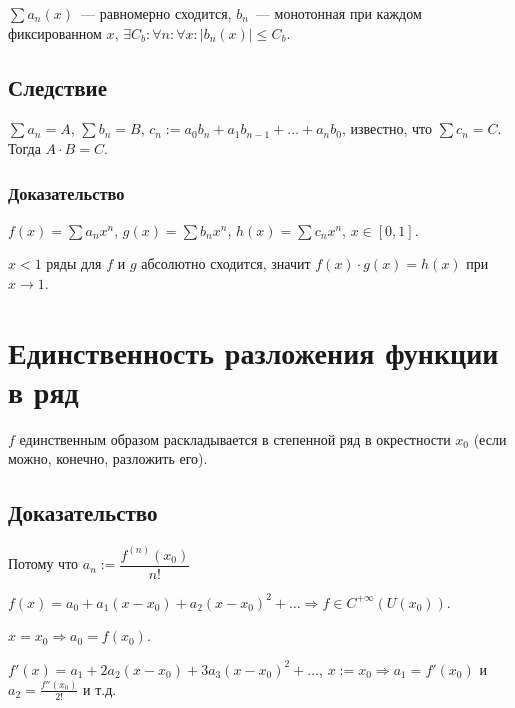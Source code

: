 \documentclass{article}
\begin{document}
            $\sum a_n(x)$~--- равномерно сходится, $b_n$~--- монотонная при каждом фиксированном $x$, $\exists C_b : \forall n : \forall x : | b_n(x) | \leq C_b$.
            
        \subsection{Следствие}
        
            $\sum a_n = A$, $\sum b_n = B$, $c_n := a_0 b_n + a_1 b_{n - 1} + \ldots + a_n b_0$, известно, что $\sum c_n = C$. Тогда $A \cdot B = C$.
            
            \subsubsection{Доказательство}
            
                $f(x) = \sum a_n x^n$, $g(x) = \sum b_n x^n$, $h(x) = \sum c_n x^n$, $x \in [0, 1]$.
                
                $x < 1$ ряды для $f$ и $g$ абсолютно сходится, значит $f(x) \cdot g(x) = h(x)$ при $x \rightarrow 1$.
                
    \newpage
    
    \section{Единственность разложения функции в ряд}
    
        $f$ единственным образом раскладывается в степенной ряд в окрестности $x_0$ (если можно, конечно, разложить его).
        
        \subsection{Доказательство}
        
            Потому что $a_n := \dfrac{f^{(n)}(x_0)}{n!}$
            
            $f(x) = a_0 + a_1(x - x_0) + a_2(x - x_0)^2 + \ldots \Rightarrow f \in C^{+\infty} \left( U(x_0) \right)$.
            
            $x = x_0 \Rightarrow a_0 = f(x_0)$.
            
            $f'(x) = a_1 + 2 a_2 (x - x_0) + 3 a_3 (x - x_0)^2 + \ldots$, $x := x_0 \Rightarrow a_1 = f'(x_0)$ и $a_2 = \frac{f''(x_0)}{2!}$ и т.д.
            
    \newpage
    
\end{document}
